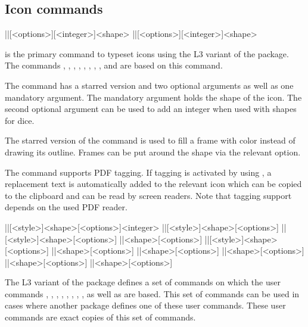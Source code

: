 \documentclass[a4paper]{article}
\begin{document}
\subsection{Icon commands}

\begin{macrodef}
|\RPGIconsUseIcon|[<options>][<integer>]{<shape>}
|\RPGIconsUseIcon*|[<options>][<integer>]{<shape>}
\end{macrodef}
\macro{\RPGIconsUseIcon} is the primary command to typeset icons using the L3 variant of the package. The commands \macro{\die}, \macro{\ability}, \macro{\saving}, \macro{\spell}, \macro{\spellschool}, \macro{\damage}, \macro{\attack}, \macro{\condition}, \macro{\alignment} and \macro{\currency} are based on this command.

The \macro{\RPGIconsUseIcon} command has a starred version and two optional arguments as well as one mandatory argument. The mandatory argument holds the shape of the icon. The second optional argument can be used to add an integer when used with shapes for dice.

The starred version of the command is used to fill a frame with color instead of drawing its outline. Frames can be put around the shape via the relevant  option.

The \macro{\RPGIconsUseIcon} command supports PDF tagging. If tagging is activated by using , a replacement text is automatically added to the relevant icon which can be copied to the clipboard and can be read by screen readers. Note that tagging support depends on the used PDF reader.

\begin{macrodef}
|\RPGIconsDie|[<style>]{<shape>}[<options>]{<integer>}
|\RPGIconsAbiliy|[<style>]{<shape>}[<options>]
|\RPGIconsSaving|[<style>]{<shape>}[<options>]
|\RPGIconsSpell|{<shape>}[<options>]
|\RPGIconsSpellschool|[<style>]{<shape>}[<options>]
|\RPGIconsDamage|{<shape>}[<options>]
|\RPGIconsAttack|{<shape>}[<options>]
|\RPGIconsCondition|{<shape>}[<options>]
|\RPGIconsAlignment|{<shape>}[<options>]
|\RPGIconsCurrency|{<shape>}[<options>]
\end{macrodef}
The L3 variant of the package defines a set of commands on which the user commands \macro{\die}, \macro{\ability}, \macro{\saving}, \macro{\spell}, \macro{\spellschool}, \macro{\damage}, \macro{\attack}, \macro{\condition}, \macro{\alignment} as well as \macro{\currency} are based. This set of commands can be used in cases where another package defines one of these user commands. These user commands are exact copies of this set of commands.
\end{document}
